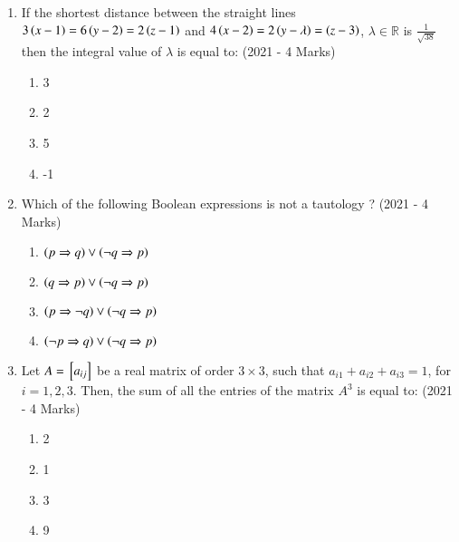 \documentclass[journal]{IEEEtran}
\begin{document}
\begin{enumerate}
{has no solution, are : 
\hfill
{(2021 - 4 Marks)}
\begin{multicols}{4}
\begin{enumerate}
\item $\lambda = 3, \mu = 5$
\item $\lambda = 3, \mu \neq 10$
\item $\lambda \neq 2, \mu = 10$
\item $\lambda = 2, \mu \neq 10$
\end{enumerate}
\end{multicols}
}
\item{
If the shortest distance between the straight lines $3\left(x-1\right)=6\left(y-2\right)=2\left(z-1\right)$ and $4\left(x-2\right)=2\left(y-\lambda\right)=\left(z-3\right)$, $\lambda \in \mathbb{R}$ is $\frac{1}{\sqrt{38}}$then the integral value of $\lambda$ is equal to:
\hfill{(2021 - 4 Marks)}
\begin{multicols}{4}
\begin{enumerate}
\item 3
\item 2
\item 5
\item -1
\end{enumerate}
\end{multicols}

}
\item{
Which of the following Boolean expressions is not a tautology ?
\hfill{(2021 - 4 Marks)}
\begin{multicols}{2}
\begin{enumerate}
\item $\left(p \Rightarrow q\right) \lor \left(\neg q \Rightarrow p\right)$
\item $\left(q \Rightarrow p\right) \lor \left(\neg q \Rightarrow p\right)$
\item $\left(p \Rightarrow \neg q\right) \lor \left(\neg q \Rightarrow p\right)$
\item $\left(\neg p \Rightarrow q\right) \lor \left(\neg q \Rightarrow p\right)$
\end{enumerate}
\end{multicols}

}
\item{
Let $A={}\left[a_{ij}\right]$ be a real matrix of order $3 \times 3$, such that $a_{i1}+a_{i2}+a_{i3}=1$, for $i=1,2,3$. Then, the sum of all the entries of the matrix $A^3$ is equal to:
\hfill
{(2021 - 4 Marks)}
\begin{multicols}{4}
\begin{enumerate}
\item 2
\item 1
\item 3
\item 9
\end{enumerate}
\end{multicols}

}
\end{enumerate}
\end{document}
